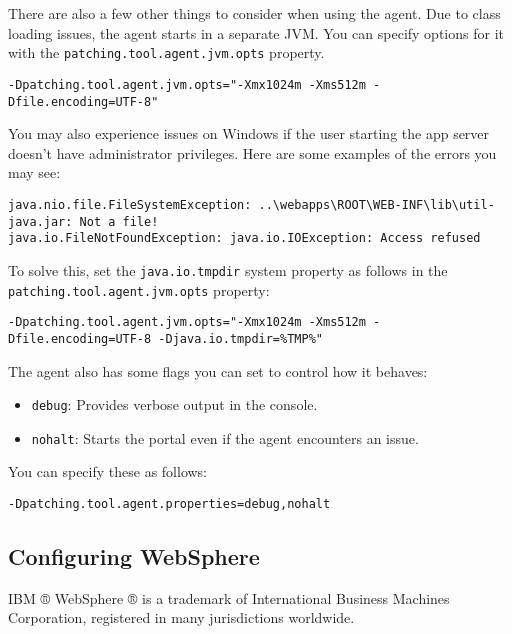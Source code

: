 There are also a few other things to consider when using the agent. Due
to class loading issues, the agent starts in a separate JVM. You can
specify options for it with the \texttt{patching.tool.agent.jvm.opts}
property.

\begin{verbatim}
-Dpatching.tool.agent.jvm.opts="-Xmx1024m -Xms512m -Dfile.encoding=UTF-8"
\end{verbatim}

You may also experience issues on Windows if the user starting the app
server doesn't have administrator privileges. Here are some examples of
the errors you may see:

\begin{verbatim}
java.nio.file.FileSystemException: ..\webapps\ROOT\WEB-INF\lib\util-java.jar: Not a file!
java.io.FileNotFoundException: java.io.IOException: Access refused
\end{verbatim}

To solve this, set the \texttt{java.io.tmpdir} system property as
follows in the \texttt{patching.tool.agent.jvm.opts} property:

\begin{verbatim}
-Dpatching.tool.agent.jvm.opts="-Xmx1024m -Xms512m -Dfile.encoding=UTF-8 -Djava.io.tmpdir=%TMP%"
\end{verbatim}

The agent also has some flags you can set to control how it behaves:

\begin{itemize}
\tightlist
\item
  \texttt{debug}: Provides verbose output in the console.
\item
  \texttt{nohalt}: Starts the portal even if the agent encounters an
  issue.
\end{itemize}

You can specify these as follows:

\begin{verbatim}
-Dpatching.tool.agent.properties=debug,nohalt
\end{verbatim}

\subsection{Configuring WebSphere}\label{configuring-websphere}

IBM ® WebSphere ® is a trademark of International Business Machines
Corporation, registered in many jurisdictions worldwide.

